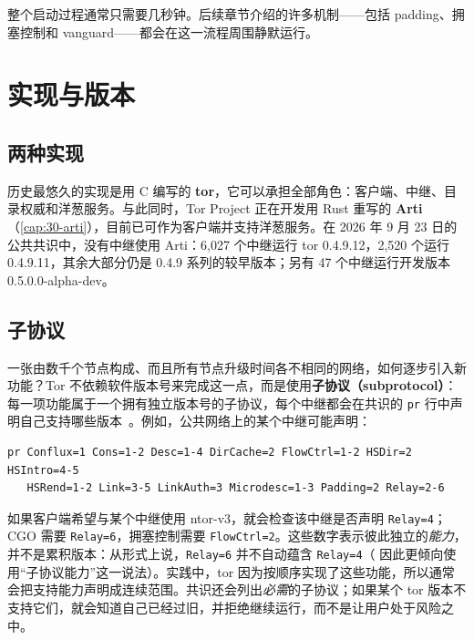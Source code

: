 整个启动过程通常只需要几秒钟。后续章节介绍的许多机制——包括 padding、拥塞控制和 vanguard——都会在这一流程周围静默运行。

\section{实现与版本}\label{sec:arch-versioni}

\subsection{两种实现}

历史最悠久的实现是用 C 编写的 \textbf{tor}，它可以承担全部角色：客户端、中继、目录权威和洋葱服务。与此同时，Tor Project 正在开发用 Rust 重写的 \textbf{Arti}（\cref{cap:30-arti}），目前已可作为客户端并支持洋葱服务。在 2026 年 9 月 23 日的公共共识中，没有中继使用 Arti：6,027 个中继运行 tor 0.4.9.12，2,520 个运行 0.4.9.11，其余大部分仍是 0.4.9 系列的较早版本；另有 47 个中继运行开发版本 0.5.0.0-alpha-dev。

\subsection{子协议}

一张由数千个节点构成、而且所有节点升级时间各不相同的网络，如何逐步引入新功能？Tor 不依赖软件版本号来完成这一点，而是使用\textbf{子协议（subprotocol）}：每一项功能属于一个拥有独立版本号的子协议，每个中继都会在共识的 \texttt{pr} 行中声明自己支持哪些版本~。例如，公共网络上的某个中继可能声明：

\begin{lstlisting}[numbers=none]
pr Conflux=1 Cons=1-2 Desc=1-4 DirCache=2 FlowCtrl=1-2 HSDir=2 HSIntro=4-5
   HSRend=1-2 Link=3-5 LinkAuth=3 Microdesc=1-3 Padding=2 Relay=2-6
\end{lstlisting}

如果客户端希望与某个中继使用 ntor-v3，就会检查该中继是否声明 \texttt{Relay=4}；CGO 需要 \texttt{Relay=6}，拥塞控制需要 \texttt{FlowCtrl=2}。这些数字表示彼此独立的\emph{能力}，并不是累积版本：从形式上说，\texttt{Relay=6} 并不自动蕴含 \texttt{Relay=4}（ 因此更倾向使用\enquote{子协议能力}这一说法）。实践中，tor 因为按顺序实现了这些功能，所以通常会把支持能力声明成连续范围。共识还会列出\emph{必需}的子协议；如果某个 tor 版本不支持它们，就会知道自己已经过旧，并拒绝继续运行，而不是让用户处于风险之中。

